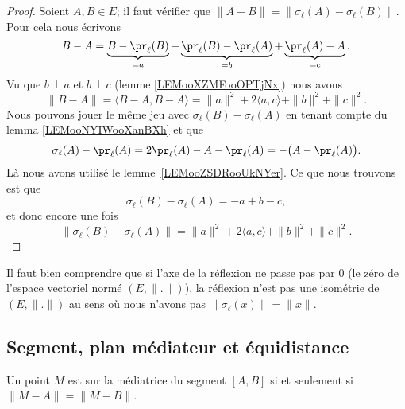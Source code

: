 \begin{proof}
	Soient \( A,B\in E\); il faut vérifier que \( \| A-B \|=\| \sigma_{\ell}(A)-\sigma_{\ell}(B) \|\). Pour cela nous écrivons
	\begin{equation}
		B-A=\underbrace{B-\pr_{\ell}(B)}_{=a}+\underbrace{\pr_{\ell}(B)-\pr_{\ell}(A)}_{=b}+\underbrace{\pr_{\ell}(A)-A}_{=c}.
	\end{equation}
    Vu que \( b\perp a\) et \( b\perp c\) (lemme \ref{LEMooXZMFooOPTjNx}) nous avons
	\begin{equation}
		\| B-A \|=\langle B-A, B-A\rangle =\| a \|^2+2\langle a, c\rangle +\| b \|^2+\| c \|^2.
	\end{equation}
    Nous pouvons jouer le même jeu avec \( \sigma_{\ell}(B)-\sigma_{\ell}(A)\) en tenant compte du lemma \ref{LEMooNYIWooXanBXh} et que
	\begin{equation}
		\sigma_{\ell}(A)-\pr_{\ell}(A)=2\pr_{\ell}(A)-A-\pr_{\ell}(A)=-\big( A-\pr_{\ell}(A) \big).
	\end{equation}
	Là nous avons utilisé le lemme~\ref{LEMooZSDRooUkNYer}. Ce que nous trouvons est que
	\begin{equation}
		\sigma_{\ell}(B)-\sigma_{\ell}(A)=-a+b-c,
	\end{equation}
	et donc encore une fois
	\begin{equation}
		\| \sigma_{\ell}(B)-\sigma_{\ell}(A) \|=\| a \|^2+2\langle a, c\rangle +\| b \|^2+\| c \|^2.
	\end{equation}
\end{proof}

\begin{remark}
	Il faut bien comprendre que si l'axe de la réflexion ne passe pas par \( 0\) (le zéro de l'espace vectoriel normé \( (E,\| . \|)\)), la réflexion n'est pas une isométrie de \( (E,\| . \|)\) au sens où nous n'avons pas \( \| \sigma_{\ell}(x) \|=\| x \|\).
\end{remark}

\subsection{Segment, plan médiateur et équidistance}

\begin{lemma}   \label{LEMooSZZWooPDHnGl}
	Un point \( M\) est sur la médiatrice du segment \( [A,B]\) si et seulement si \( \| M-A \|=\| M-B \|\).
\end{lemma}

